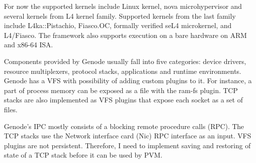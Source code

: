 For now the supported kernels include Linux kernel, nova microhypervisor and
several kernels from L4 kernel family. Supported kernels from the last family
include L4ka::Pistachio, Fiasco.OC, formally verified seL4 microkernel, and
L4/Fiasco.  The framework also supports execution on a bare hardware on ARM and
x86-64 ISA.

Components provided by Genode usually fall into five categories: device drivers,
resource multiplexers, protocol stacks, applications and runtime environments.
Genode has a VFS with possibility of adding custom plugins to it. For instance,
a part of process memory can be exposed as a file with the ram-fs plugin. TCP
stacks are also implemented as VFS plugins that expose each socket as a set of
files. 

Genode's IPC mostly consists of a blocking remote procedure calls (RPC). The TCP
stacks use the Network interface card (Nic) RPC interface as an input. VFS
plugins are not persistent. Therefore, I need to implement saving and restoring
of state of a TCP stack before it can be used by PVM.  
